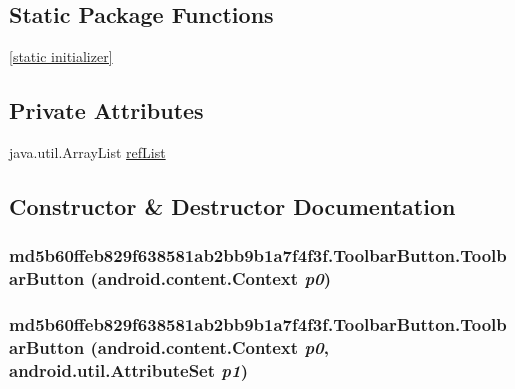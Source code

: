 \subsection*{Static Package Functions}
\begin{CompactItemize}
\item 
\hyperlink{classmd5b60ffeb829f638581ab2bb9b1a7f4f3f_1_1_toolbar_button_7aef286ccbe4c97bbaaafc0fd6808076}{\mbox{[}static initializer\mbox{]}}
\end{CompactItemize}
\subsection*{Private Attributes}
\begin{CompactItemize}
\item 
java.util.ArrayList \hyperlink{classmd5b60ffeb829f638581ab2bb9b1a7f4f3f_1_1_toolbar_button_fa96144f45d698d61368958ea346709a}{refList}
\end{CompactItemize}


\subsection{Constructor \& Destructor Documentation}
\hypertarget{classmd5b60ffeb829f638581ab2bb9b1a7f4f3f_1_1_toolbar_button_3c5b1d6dde9df6e1f5c4364406222cd1}{
\subsubsection[{ToolbarButton}]{\setlength{\rightskip}{0pt plus 5cm}md5b60ffeb829f638581ab2bb9b1a7f4f3f.ToolbarButton.ToolbarButton (android.content.Context {\em p0})}}
\label{classmd5b60ffeb829f638581ab2bb9b1a7f4f3f_1_1_toolbar_button_3c5b1d6dde9df6e1f5c4364406222cd1}


\hypertarget{classmd5b60ffeb829f638581ab2bb9b1a7f4f3f_1_1_toolbar_button_ba93a3ac87dc10f5713a4882c68fee02}{
\subsubsection[{ToolbarButton}]{\setlength{\rightskip}{0pt plus 5cm}md5b60ffeb829f638581ab2bb9b1a7f4f3f.ToolbarButton.ToolbarButton (android.content.Context {\em p0}, \/  android.util.AttributeSet {\em p1})}}
\label{classmd5b60ffeb829f638581ab2bb9b1a7f4f3f_1_1_toolbar_button_ba93a3ac87dc10f5713a4882c68fee02}


